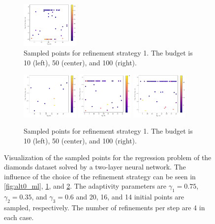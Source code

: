 \begin{figure}[H]
\begin{subfigure}{\textwidth}
		\includegraphics[width=0.31\textwidth]{figures/Adaptive_random/Machine_learning_first/Alternative_1_budget_100}
		\caption{ Sampled points for refinement strategy 1. The budget is 10 (left), 50 (center), and 100 (right). }
		\label{fig:alt1_ml}
	\end{subfigure}
	\begin{subfigure}{\textwidth}
		\centering
		\includegraphics[width=0.31\textwidth]{figures/Adaptive_random/Machine_learning_first/Alternative_2_budget_10}
		\includegraphics[width=0.31\textwidth]{figures/Adaptive_random/Machine_learning_first/Alternative_2_budget_50}
		\includegraphics[width=0.31\textwidth]{figures/Adaptive_random/Machine_learning_first/Alternative_2_budget_100}
		\caption{ Sampled points for refinement strategy 1. The budget is 10 (left), 50 (center), and 100 (right). }
		\label{fig:alt2_ml}
	\end{subfigure}
	
	\caption{ Visualization of the sampled points for the regression problem of the diamonds dataset solved by a two-layer neural network. The influence of the choice of the refinement strategy can be seen in \ref{fig:alt0_ml}, \ref{fig:alt1_ml}, and \ref{fig:alt2_ml}. The adaptivity parameters are $ \gamma_1 = 0.75 $, $ \gamma_2 = 0.35 $, and $ \gamma_3 = 0.6 $ and 20, 16, and 14 initial points are sampled, respectively. The number of refinements per step are 4 in each case. }
	\label{fig:Alternatives_ml_visualization}
\end{figure}

